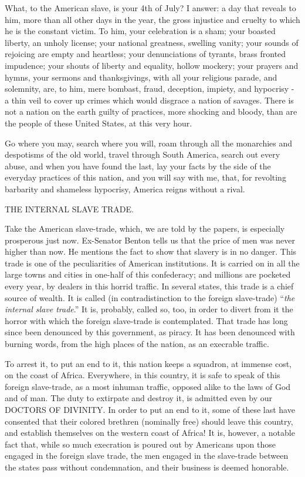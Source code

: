 What, to the American slave, is your 4th of July? I answer: a day that reveals to him, more than all other days in the year, the gross injustice and cruelty to which he is the constant victim. To him, your celebration is a sham; your boasted liberty, an unholy license; your national greatness, swelling vanity; your sounds of rejoicing are empty and heartless; your denunciations of tyrants, brass fronted impudence; your shouts of liberty and equality, hollow mockery; your prayers and hymns, your sermons and thanksgivings, with all your religious parade, and solemnity, are, to him, mere bombast, fraud, deception, impiety, and hypocrisy - a thin veil to cover up crimes which would disgrace a nation of savages. There is not a nation on the earth guilty of practices, more shocking and bloody, than are the people of these United States, at this very hour.\par

Go where you may, search where you will, roam through all the monarchies and despotisms of the old world, travel through South America, search out every abuse, and when you have found the last, lay your facts by the side of the everyday practices of this nation, and you will say with me, that, for revolting barbarity and shameless hypocrisy, America reigns without a rival.\par

THE INTERNAL SLAVE TRADE.\par

Take the American slave-trade, which, we are told by the papers, is especially prosperous just now. Ex-Senator Benton tells us that the price of men was never higher than now. He mentions the fact to show that slavery is in no danger. This trade is one of the peculiarities of American institutions. It is carried on in all the large towns and cities in one-half of this confederacy; and millions are pocketed every year, by dealers in this horrid traffic. In several states, this trade is a chief source of wealth. It is called (in contradistinction to the foreign slave-trade) “\textit{the internal slave trade}.” It is, probably, called so, too, in order to divert from it the horror with which the foreign slave-trade is contemplated. That trade has long since been denounced by this government, as piracy. It has been denounced with burning words, from the high places of the nation, as an execrable traffic.\par

To arrest it, to put an end to it, this nation keeps a squadron, at immense cost, on the coast of Africa. Everywhere, in this country, it is safe to speak of this foreign slave-trade, as a most inhuman traffic, opposed alike to the laws of God and of man. The duty to extirpate and destroy it, is admitted even by our DOCTORS OF DIVINITY. In order to put an end to it, some of these last have consented that their colored brethren (nominally free) should leave this country, and establish themselves on the western coast of Africa! It is, however, a notable fact that, while so much execration is poured out by Americans upon those engaged in the foreign slave trade, the men engaged in the slave-trade between the states pass without condemnation, and their business is deemed honorable.\par

